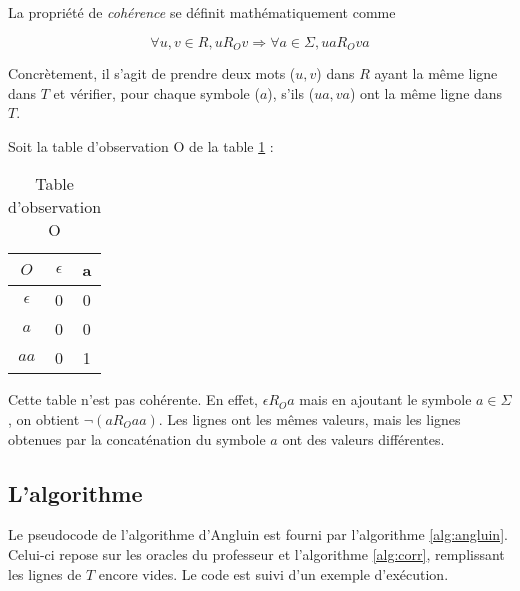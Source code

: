 La propriété de \emph{cohérence} se définit mathématiquement comme

$$ \forall u,v \in R, u R_O v \Rightarrow \forall a \in \Sigma, ua R_O va$$

Concrètement, il s'agit de prendre deux mots ($u,v$) dans $R$ ayant la même ligne dans $T$ et vérifier, pour chaque symbole ($a$), s'ils ($ua,va$) ont la même ligne dans $T$.

\begin{example}
	Soit la table d'observation O de la table \ref{tab:Oex} :

	\begin{table}[H]
		\centering
	\begin{tabular}{|c|c|c|}
		\hline
		$O$ & $\epsilon$ & a\\
		\hline
		$\epsilon$ & 0 & 0\\
		$a$ & 0 & 0\\
		\hline
		$aa$ & 0 & 1\\
		\hline
	\end{tabular}\caption{Table d'observation O}\label{tab:Oex}
\end{table}
	\vspace{0.5cm}
	Cette table n'est pas cohérente. En effet, $\epsilon R_O a$ mais en ajoutant le symbole $a\in \Sigma$, on obtient $\neg (a R_O aa)$. Les lignes ont les mêmes valeurs, mais les lignes obtenues par la concaténation du symbole $a$ ont des valeurs différentes.
\end{example}



\subsection{L'algorithme}\label{ss:a_exemple}

Le pseudocode de l'algorithme d'Angluin est fourni par l'algorithme \ref{alg:angluin}\cite{Neider14}. Celui-ci repose sur les oracles du professeur et l'algorithme \ref{alg:corr}, remplissant les lignes de $T$ encore vides. Le code est suivi d'un exemple d'exécution.

